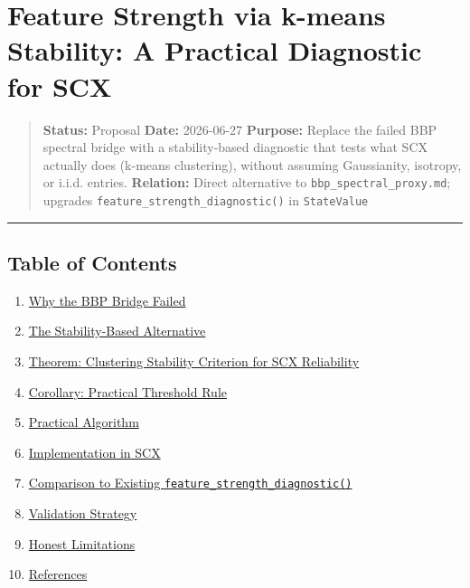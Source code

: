 \documentclass[
  12pt,
]{ctexart}
\author{SCX}
\date{2026}
\providecommand{\tightlist}{%
  \setlength{\itemsep}{0pt}\setlength{\parskip}{0pt}}
\begin{document}
\section{Feature Strength via k-means Stability: A Practical Diagnostic
for
SCX}\label{feature-strength-via-k-means-stability-a-practical-diagnostic-for-scx}

\begin{quote}
\textbf{Status:} Proposal \textbar{} \textbf{Date:} 2026-06-27
\textbf{Purpose:} Replace the failed BBP spectral bridge with a
stability-based diagnostic that tests what SCX actually does (k-means
clustering), without assuming Gaussianity, isotropy, or i.i.d. entries.
\textbf{Relation:} Direct alternative to
\texttt{bbp\_spectral\_proxy.md}; upgrades
\texttt{feature\_strength\_diagnostic()} in \texttt{StateValue}
\end{quote}

\begin{center}\rule{0.5\linewidth}{0.5pt}\end{center}

\subsection{Table of Contents}\label{table-of-contents}

\begin{enumerate}
\def\labelenumi{\arabic{enumi}.}
\tightlist
\item
  \hyperref[1-why-the-bbp-bridge-failed]{Why the BBP Bridge Failed}
\item
  \hyperref[2-the-stability-based-alternative]{The Stability-Based
  Alternative}
\item
  \hyperref[3-theorem-clustering-stability-criterion-for-scx-reliability]{Theorem:
  Clustering Stability Criterion for SCX Reliability}
\item
  \hyperref[4-corollary-practical-threshold-rule]{Corollary: Practical
  Threshold Rule}
\item
  \hyperref[5-practical-algorithm]{Practical Algorithm}
\item
  \hyperref[6-implementation-in-scx]{Implementation in SCX}
\item
  \hyperref[7-comparison-to-existing-feature_strength_diagnostic]{Comparison
  to Existing \texttt{feature\_strength\_diagnostic()}}
\item
  \hyperref[8-validation-strategy]{Validation Strategy}
\item
  \hyperref[9-honest-limitations]{Honest Limitations}
\item
  \hyperref[10-references]{References}
\end{enumerate}
\end{document}
